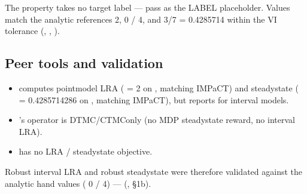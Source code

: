 \documentclass[a4paper,10pt,english]{sphinxmanual}
\begin{document}
\sphinxAtStartPar
The  property takes no target label — pass \sphinxcode{\sphinxupquote{\sphinxhyphen{}}} as the LABEL placeholder. Values
match the analytic references 2, 0 / 4, and 3/7 = 0.4285714 within the VI tolerance
(, , ).


\subsection{Peer tools and validation}
\label{\detokenize{manual/lra-steadystate:peer-tools-and-validation}}\begin{itemize}
\item {} 
\sphinxAtStartPar
{} computes point\sphinxhyphen{}model LRA ( = 2 on , matching
IMPaCT) and steady\sphinxhyphen{}state ( = 0.4285714286 on , matching IMPaCT),
but reports  for interval models.

\item {} 
\sphinxAtStartPar
{}’s  operator is DTMC/CTMC\sphinxhyphen{}only (no MDP steady\sphinxhyphen{}state reward, no interval
LRA).

\item {} 
\sphinxAtStartPar
{} has no LRA / steady\sphinxhyphen{}state objective.

\end{itemize}

\sphinxAtStartPar
Robust interval LRA and robust steady\sphinxhyphen{}state were therefore validated against the
analytic hand values ( 0 / 4) — 
(,  \S{}1b).
\end{document}
